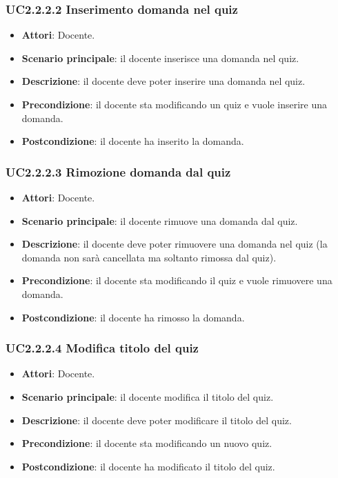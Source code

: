 \subsubsection{UC2.2.2.2 Inserimento domanda nel quiz}
\begin{itemize}
\item \textbf{Attori}: Docente.
\item \textbf{Scenario principale}: il docente inserisce una domanda nel quiz.
\item \textbf{Descrizione}: il docente deve poter inserire una domanda nel quiz.
\item \textbf{Precondizione}: il docente sta modificando un quiz e vuole inserire una domanda.
\item \textbf{Postcondizione}: il docente ha inserito la domanda.
\end{itemize}
\subsubsection{UC2.2.2.3 Rimozione domanda dal quiz}
\begin{itemize}
\item \textbf{Attori}: Docente.
\item \textbf{Scenario principale}: il docente rimuove una domanda dal quiz.
\item \textbf{Descrizione}: il docente deve poter rimuovere una domanda nel quiz (la domanda non sarà cancellata ma soltanto rimossa dal quiz).
\item \textbf{Precondizione}: il docente sta modificando il quiz e vuole rimuovere una domanda.
\item \textbf{Postcondizione}: il docente ha rimosso la domanda.
\end{itemize}
\subsubsection{UC2.2.2.4 Modifica titolo del quiz}
\begin{itemize}
\item \textbf{Attori}: Docente.
\item \textbf{Scenario principale}: il docente modifica il titolo del quiz.
\item \textbf{Descrizione}: il docente deve poter modificare il titolo del quiz.
\item \textbf{Precondizione}: il docente sta modificando un nuovo quiz.
\item \textbf{Postcondizione}: il docente ha modificato il titolo del quiz.
\end{itemize}
